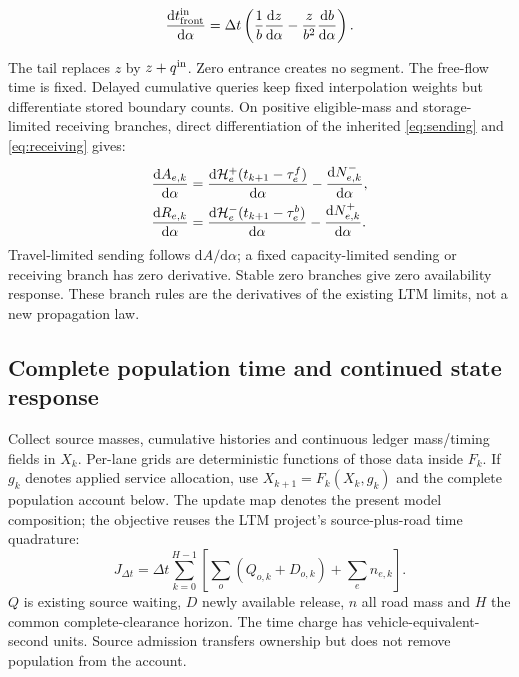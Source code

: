 \documentclass[10pt,a4paper]{article}
\begin{document}
\begin{equation}
 \frac{\mathrm dt^{\rm in}_{\rm front}}{\mathrm d\alpha}
 =\Delta t\left(\frac1b\frac{\mathrm dz}{\mathrm d\alpha}
       -\frac z{b^2}\frac{\mathrm db}{\mathrm d\alpha}\right).
 \label{eq:entry-derivative}
\end{equation}

The tail replaces $z$ by $z+q^{\rm in}$. Zero entrance creates no segment.
The free-flow time is fixed. Delayed cumulative queries keep fixed
interpolation weights but differentiate stored boundary counts. On
positive eligible-mass and storage-limited receiving branches,
direct differentiation of the inherited \eqref{eq:sending} and \eqref{eq:receiving} gives:
\begin{equation}
 \begin{aligned}
 \frac{\mathrm dA_{e,k}}{\mathrm d\alpha}
 &=\frac{\mathrm d{\cal H}^+_e(t_{k+1}-\tau^f_e)}{\mathrm d\alpha}
                     -\frac{\mathrm dN^-_{e,k}}{\mathrm d\alpha},\\
 \frac{\mathrm dR_{e,k}}{\mathrm d\alpha}
 &=\frac{\mathrm d{\cal H}^-_e(t_{k+1}-\tau^b_e)}{\mathrm d\alpha}
                     -\frac{\mathrm dN^+_{e,k}}{\mathrm d\alpha}.
 \end{aligned}
 \label{eq:ltm-derivative}
\end{equation}
Travel-limited sending follows $\mathrm dA/\mathrm d\alpha$; a fixed
capacity-limited sending or receiving branch has zero derivative.
Stable zero branches give zero availability response. These branch rules
are the derivatives of the existing LTM limits, not a new propagation law.
\par

\par\begin{samepage}
\section{Complete population time and continued state response}


Collect source masses, cumulative histories and continuous ledger
mass/timing fields in $X_k$. Per-lane grids are deterministic functions
of those data inside $F_k$. If $g_k$ denotes applied service allocation,
use $X_{k+1}=F_k(X_k,g_k)$ and the complete population account below.
The update map denotes the present model composition; the objective reuses the LTM project's source-plus-road time quadrature:
\begin{equation}
 J_{\Delta t}=\Delta t\sum_{k=0}^{H-1}
 \left[\sum_o(Q_{o,k}+D_{o,k})+\sum_en_{e,k}\right].
 \label{eq:tst}
\end{equation}
$Q$ is existing source waiting, $D$ newly available release, $n$ all road
mass and $H$ the common complete-clearance horizon. The time charge has
vehicle-equivalent-second units. Source admission transfers ownership but
does not remove population from the account.
\par\end{samepage}
\end{document}
